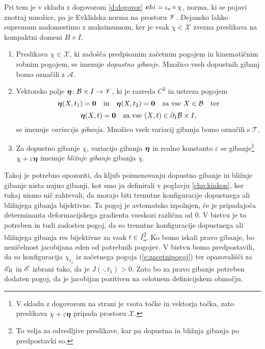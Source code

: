 Pri tem je v skladu z dogovorom \ref{d:dogovor} $\boldsymbol chi=\iota_o\circ\chi$, norma, ki se pojavi
znotraj množice, pa je Evklidska norma na prostoru $\mathscr V$.
Dejansko lahko supremum nadomestimo z maksimumom, ker je vsak $\chi\in\mathcal{X}$
zvezna preslikava na kompaktni domeni $B\times I$.

\begin{definicija}
	\begin{enumerate}
		\item Preslikava $\chi\in\mathcal{X}$, ki zadošča predpisanim začetnim pogojem in kinematičnim robnim pogojem,
			se imenuje \emph{dopustno gibanje}. Množico vseh dopustnih gibanj bomo označili z $\mathcal{A}$.
		\item Vektorsko polje $\boldsymbol \eta\colon \mathcal B\times I\to\mathscr V$, ki je razreda $C^2$ in
			ustreza pogojem
			\[
				\boldsymbol \eta(X,t_1)=\boldsymbol 0\quad \textrm{in} \quad
				\boldsymbol \eta(X,t_2)=\boldsymbol 0\quad \textrm{za vse}\ X\in \mathcal B\quad\textrm{ter}
			\]
			\[
				\vek{\eta}(X,t)=\vek{0}\quad \textrm{za vse}\ (X,t)\in \partial_1 \B\times I,
			\]
			se imenuje \emph{variacija gibanja}. Množico vseh variacij gibanja bomo ozna\-čili s $\mathcal{T}$.
		\item Za dopustno gibanje $\chi$, variacijo gibanja $\boldsymbol \eta$ in realno konstanto $\varepsilon$ se gibanje\footnote{
			V skladu z dogovorom na strani \pageref{seto} je vsota točke in vektorja točka, zato preslikava
			$\chi+\varepsilon\boldsymbol \eta$ pripada prostoru $\mathcal{X}$.}
			$\chi+\varepsilon\boldsymbol \eta$ imenuje \emph{bližnje gibanje} gibanja $\chi$.
	\end{enumerate}
\end{definicija}

Takoj je potrebno opozoriti, da kljub poimenovanju dopustno gibanje in bližnje gibanje nista nujno gibanji,
kot smo ju definirali v poglavju \ref{chp:kinkon}, ker tukaj nismo nič zahtevali, da morajo biti
trenutne konfiguracije dopustnega ali bližnjega gibanja bijektivne.
Ta pogoj je avtomatsko izpolnjen, če je pripadajoča determinanta deformacijskega
gradienta vseskozi različna od 0. V bistvu je to potreben in tudi zadosten pogoj, da so trenutne konfiguracije
dopustnega ali bližnjega gibanja res bijektivne za vsak $t\in I$\footnote{
To velja za odvedljive preslikave, kar pa dopustna in bližnja gibanja po predpostavki so.}.
Ko bomo iskali pravo gibanje, bo neničelnost jacobijana eden od potrebnih pogojev.
V bistvu bomo predpostavili, da so konfiguracija $\chi_{t_1}$ iz začetnega pogoja (\ref{e:zacetnipogoj})
ter opazovališči za $\mathscr E_R$ in $\mathscr E$ izbrani tako, da je $J(\cdot,t_1)>0$. Zato bo za pravo gibanje
potreben dodaten pogoj, da je jacobijan pozitiven na celotnem definicijskem območju.

